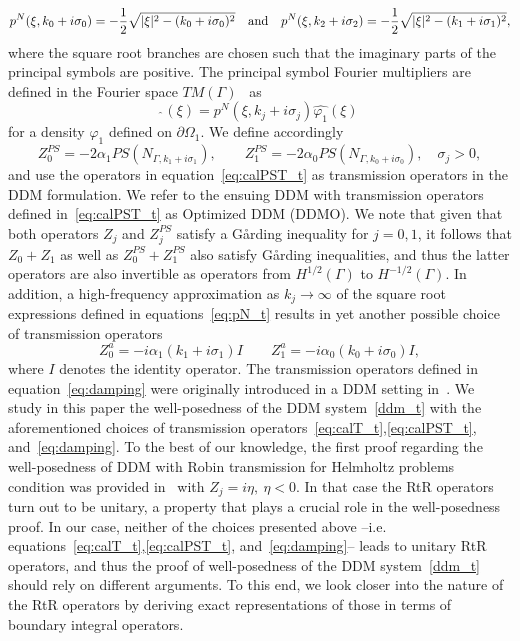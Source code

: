 \documentclass[11pt]{article}
\numberwithin{equation}{section}
\begin{document}
 \begin{equation}\label{eq:pN_t}
 p^N(\xi, k_0+i\sigma_0)=-\frac{1}{2}\sqrt{|\xi|^2-(k_0+i\sigma_0)^2}\quad {\rm and}\quad p^N(\xi, k_2+i\sigma_2)=-\frac{1}{2}\sqrt{|\xi|^2-(k_1+i\sigma_1)^2},
 \end{equation}
 where the square root branches are chosen such that the imaginary parts of the principal symbols are positive. The principal symbol Fourier multipliers are defined in the Fourier space $TM(\Gamma)$~\cite{AntoineX} as
 \begin{equation}
   [PS(N_{\Gamma,k_j+i\sigma_j})\varphi_1]\hat\ (\xi)=p^N(\xi, k_j+i\sigma_j)\hat{\varphi_1}(\xi)
 \end{equation}
 for a density $\varphi_1$ defined on $\partial\Omega_1$. We define accordingly
 \begin{equation}\label{eq:calPST_t}
 Z_0^{PS}=-2\alpha_1PS(N_{\Gamma,k_1+i\sigma_1}),\qquad Z_1^{PS} = -2\alpha_0PS(N_{\Gamma,k_0+i\sigma_0}),\quad \sigma_j>0,
 \end{equation}
 and use the operators in equation~\eqref{eq:calPST_t} as transmission operators in the DDM formulation. We refer to the ensuing DDM with transmission operators defined in~\eqref{eq:calPST_t} as Optimized DDM (DDMO). We note that given that both operators $Z_j$ and $Z_j^{PS}$ satisfy a G\aa rding inequality for $j=0,1$, it follows that $Z_0+Z_1$ as well as $Z_0^{PS}+Z_1^{PS}$ also satisfy  G\aa rding inequalities, and thus the latter operators are also invertible as operators from $H^{1/2}(\Gamma)$ to $H^{-1/2}(\Gamma)$. In addition, a high-frequency approximation as $k_j\to\infty$ of the square root expressions defined in equations~\eqref{eq:pN_t} results in yet another possible choice of transmission operators
 \begin{equation}\label{eq:damping}
   Z_0^a=-i\alpha_1(k_1+i\sigma_1)I\qquad Z_1^a=-i\alpha_0(k_0+i\sigma_0)I,
 \end{equation}
 where $I$ denotes the identity operator. The transmission operators defined in equation~\eqref{eq:damping} were originally introduced in a DDM setting in~\cite{boubendir2000domain}. We study in this paper the well-posedness of the DDM system~\eqref{ddm_t} with the aforementioned choices of transmission operators~\eqref{eq:calT_t},\phantom{a}\eqref{eq:calPST_t}, and~\eqref{eq:damping}. To the best of our knowledge, the first proof regarding the well-posedness of DDM  with Robin transmission for Helmholtz problems condition was provided in~\cite{Collino1} with $Z_j=i\eta,\ \eta<0$. In that case the RtR operators turn out to be unitary, a property that plays a crucial role in the well-posedness proof. In our case, neither of the choices presented above --i.e. equations~\eqref{eq:calT_t},\eqref{eq:calPST_t}, and~\eqref{eq:damping}-- leads to unitary RtR operators, and thus the proof of well-posedness of the DDM system~\eqref{ddm_t} should rely on different arguments. To this end, we look closer into the nature of the RtR operators by deriving exact representations of those in terms of boundary integral operators.
\end{document}
